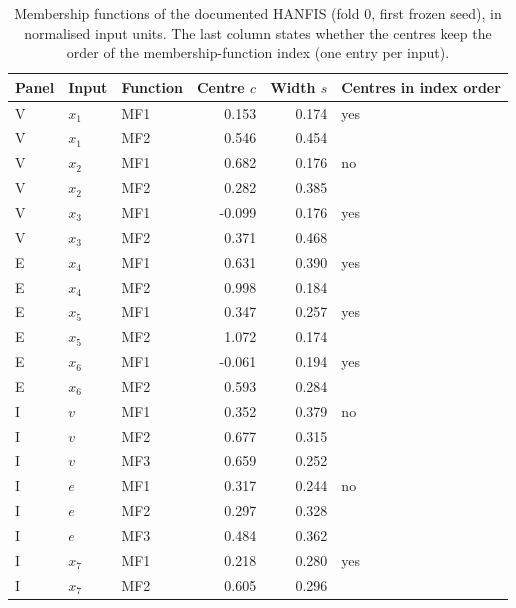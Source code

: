 \documentclass[pdflatex,sn-basic]{sn-jnl}
\theoremstyle{thmstyleone}%
\theoremstyle{thmstyletwo}%
\theoremstyle{thmstylethree}%
\begin{document}
\begin{table}[ht]
\caption{Membership functions of the documented HANFIS (fold 0, first frozen seed), in normalised input units. The last column states whether the centres keep the order of the membership-function index (one entry per input).}
\footnotesize
\begin{tabular}{@{}lllrrl@{}}
\hline
Panel & Input & Function & Centre $c$ & Width $s$ & Centres in index order\\
\hline
V & $x_1$ & MF1 & 0.153 & 0.174 & yes\\
V & $x_1$ & MF2 & 0.546 & 0.454 & \\
V & $x_2$ & MF1 & 0.682 & 0.176 & no\\
V & $x_2$ & MF2 & 0.282 & 0.385 & \\
V & $x_3$ & MF1 & -0.099 & 0.176 & yes\\
V & $x_3$ & MF2 & 0.371 & 0.468 & \\
E & $x_4$ & MF1 & 0.631 & 0.390 & yes\\
E & $x_4$ & MF2 & 0.998 & 0.184 & \\
E & $x_5$ & MF1 & 0.347 & 0.257 & yes\\
E & $x_5$ & MF2 & 1.072 & 0.174 & \\
E & $x_6$ & MF1 & -0.061 & 0.194 & yes\\
E & $x_6$ & MF2 & 0.593 & 0.284 & \\
I & $v$ & MF1 & 0.352 & 0.379 & no\\
I & $v$ & MF2 & 0.677 & 0.315 & \\
I & $v$ & MF3 & 0.659 & 0.252 & \\
I & $e$ & MF1 & 0.317 & 0.244 & no\\
I & $e$ & MF2 & 0.297 & 0.328 & \\
I & $e$ & MF3 & 0.484 & 0.362 & \\
I & $x_7$ & MF1 & 0.218 & 0.280 & yes\\
I & $x_7$ & MF2 & 0.605 & 0.296 & \\
\hline
\end{tabular}
\end{table}
\end{document}
